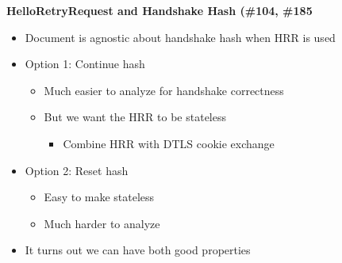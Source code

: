 \documentclass[helvetica]{seminar}
\newcommand{\heading}[1]{%
  \begin{center} 
    \large\bf 
    #1 
  \end{center} 
  \vspace{.4 in}}
\begin{document}
\begin{slide}
  \heading{HelloRetryRequest and Handshake Hash (\#104, \#185}

  \begin{itemize}
  \item Document is agnostic about handshake hash when HRR is used
  \item Option 1: Continue hash
    \begin{itemize}
    \item Much easier to analyze for handshake correctness
    \item But we want the HRR to be stateless
      \begin{itemize}
      \item Combine HRR with DTLS cookie exchange
      \end{itemize}
    \end{itemize}

  \item Option 2: Reset hash
    \begin{itemize}
    \item Easy to make stateless
    \item Much harder to analyze
    \end{itemize}

  \item It turns out we can have both good properties
  \end{itemize}
\end{slide}
\end{document}
